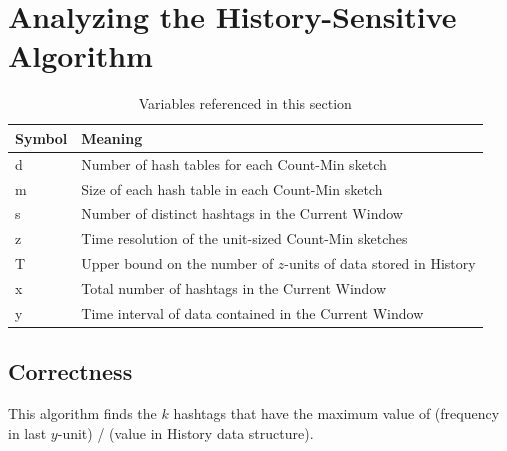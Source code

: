 \documentclass[twoside]{article}
\begin{document}

\section{Analyzing the History-Sensitive Algorithm}

\begin{table}[h]
\centering
\begin{tabular}{@{}ll@{}}
\toprule
Symbol & Meaning                                                           \\ \midrule
d      & Number of hash tables for each Count-Min sketch                        \\
m      & Size of each hash table in each Count-Min sketch                  \\
s      & Number of distinct hashtags in the Current Window                 \\
z      & Time resolution of the unit-sized Count-Min sketches                   \\
T      & Upper bound on the number of $z$-units of data stored in History                   \\
x      & Total number of hashtags in the Current Window                   \\
y      & Time interval of data contained in the Current Window                   \\ \bottomrule
\end{tabular}
\caption{Variables referenced in this section}
\end{table}

\subsection{Correctness} \label{sec:Correctness}

This algorithm finds the $k$ hashtags that have the maximum value of (frequency in last $y$-unit) / (value in History data structure).
\end{document}
